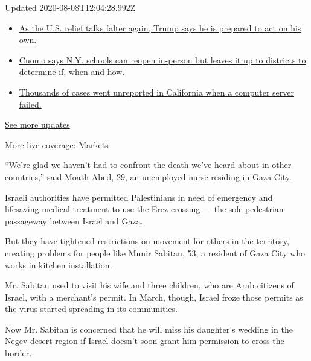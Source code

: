 Updated 2020-08-08T12:04:28.992Z

\begin{itemize}
\tightlist
\item
  \href{https://www.nytimes.com/2020/08/07/world/covid-19-news.html?action=click\&pgtype=Article\&state=default\&region=MAIN_CONTENT_1\&context=storylines_live_updates\#link-1f86d03a}{As
  the U.S. relief talks falter again, Trump says he is prepared to act
  on his own.}
\item
  \href{https://www.nytimes.com/2020/08/07/world/covid-19-news.html?action=click\&pgtype=Article\&state=default\&region=MAIN_CONTENT_1\&context=storylines_live_updates\#link-3f64a70a}{Cuomo
  says N.Y. schools can reopen in-person but leaves it up to districts
  to determine if, when and how.}
\item
  \href{https://www.nytimes.com/2020/08/07/world/covid-19-news.html?action=click\&pgtype=Article\&state=default\&region=MAIN_CONTENT_1\&context=storylines_live_updates\#link-14e70066}{Thousands
  of cases went unreported in California when a computer server failed.}
\end{itemize}

\href{https://www.nytimes.com/2020/08/07/world/covid-19-news.html?action=click\&pgtype=Article\&state=default\&region=MAIN_CONTENT_1\&context=storylines_live_updates}{See
more updates}

More live coverage:
\href{https://www.nytimes.com/live/2020/08/07/business/stock-market-today-coronavirus?action=click\&pgtype=Article\&state=default\&region=MAIN_CONTENT_1\&context=storylines_live_updates}{Markets}

``We're glad we haven't had to confront the death we've heard about in
other countries,'' said Moath Abed, 29, an unemployed nurse residing in
Gaza City.

Israeli authorities have permitted Palestinians in need of emergency and
lifesaving medical treatment to use the Erez crossing --- the sole
pedestrian passageway between Israel and Gaza.

But they have tightened restrictions on movement for others in the
territory, creating problems for people like Munir Sabitan, 53, a
resident of Gaza City who works in kitchen installation.

Mr. Sabitan used to visit his wife and three children, who are Arab
citizens of Israel, with a merchant's permit. In March, though, Israel
froze those permits as the virus started spreading in its communities.

Now Mr. Sabitan is concerned that he will miss his daughter's wedding in
the Negev desert region if Israel doesn't soon grant him permission to
cross the border.


